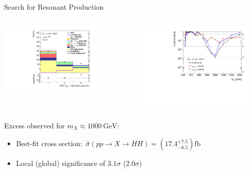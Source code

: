 \documentclass[11pt, xcolor={dvipsnames}, aspectratio=169]{beamer}
\begin{document}
\begin{frame}{Search for Resonant \allbold{\HH} Production}
  \vspace*{0.25em}
  \begin{columns}[onlytextwidth, b]
    \centering

    \includegraphics[width=0.75\textwidth, trim=0 0.3em 0 1em,
    clip]{results_res/postfit/Region_BMin0_incJet1_distPNN1000_J2_Y2015_DLLOS_T2_SpcTauHH_L0_GlobalFit_conditionnal_mu0log}\hspace*{0.14\textwidth}

    \centering

    \includegraphics[width=0.9\textwidth, trim=0 0.3em 0 1em]{results_res/resonant_comb_pvalues}
  \end{columns}

  Excess observed for $m_{X} \approx \SI{1000}{\GeV}$:\\[0.4em]
  \begin{itemize}
    \setlength{\itemsep}{0.4em}
  \item Best-fit cross section:~$\hat{\sigma}(pp \to X \to HH) = \left( 17.4^{+7.5}_{-6.5}
    \right)\si{\femto\barn}$
  \item Local (global) significance of $3.1\sigma$ ($2.0\sigma$)
  \end{itemize}


\end{frame}
\end{document}
